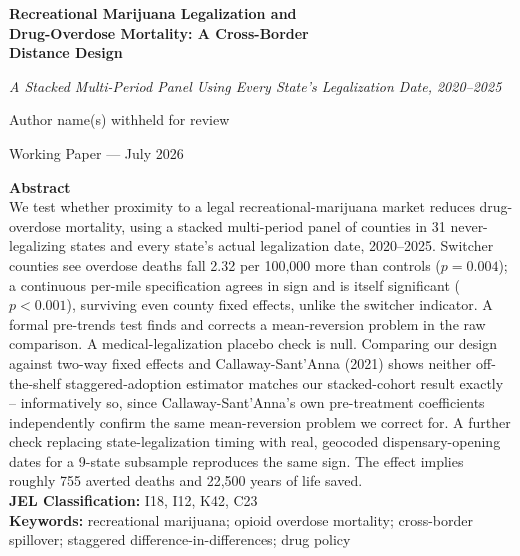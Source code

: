 \documentclass[11pt]{article}
\title{}
\author{}
\date{}
\begin{document}
\begin{titlepage}
\begin{center}
\vspace*{1.5cm}
{\LARGE \bfseries Recreational Marijuana Legalization and\\
Drug-Overdose Mortality: A Cross-Border\\
Distance Design\par}
\vspace{0.3cm}
{\large \itshape A Stacked Multi-Period Panel Using Every State's Legalization Date, 2020--2025\par}
\vspace{1.2cm}
{\large Author name(s) withheld for review\par}
\vspace{0.3cm}
{\normalsize Working Paper --- July 2026\par}
\end{center}

\vspace{1.2cm}
\noindent\textbf{Abstract} \\[4pt]
\noindent We test whether proximity to a legal recreational-marijuana
market reduces drug-overdose mortality, using a stacked multi-period
panel of counties in 31 never-legalizing states and every state's
actual legalization date, 2020--2025. Switcher counties see overdose
deaths fall 2.32 per 100,000 more than controls ($p=0.004$); a
continuous per-mile specification agrees in sign and is itself
significant ($p<0.001$), surviving even county fixed effects, unlike
the switcher indicator. A formal pre-trends test finds and corrects a
mean-reversion problem in the raw comparison. A medical-legalization
placebo check is null. Comparing our design against two-way fixed
effects and Callaway-Sant'Anna (2021) shows neither off-the-shelf
staggered-adoption estimator matches our stacked-cohort result exactly
-- informatively so, since Callaway-Sant'Anna's own pre-treatment
coefficients independently confirm the same mean-reversion problem we
correct for. A further check replacing state-legalization timing with
real, geocoded dispensary-opening dates for a 9-state subsample
reproduces the same sign. The effect implies roughly 755 averted
deaths and 22,500 years of life saved. \\[10pt]
\noindent\textbf{JEL Classification:} I18, I12, K42, C23 \\
\noindent\textbf{Keywords:} recreational marijuana; opioid overdose
mortality; cross-border spillover; staggered difference-in-differences;
drug policy


\end{titlepage}
\end{document}
